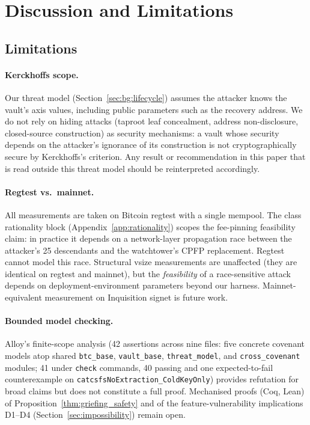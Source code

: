 
\section{Discussion and Limitations}
\label{sec:discussion}

\subsection{Limitations}
\label{sec:disc:limitations}

\paragraph{Kerckhoffs scope.}
Our threat model (Section~\ref{sec:bg:lifecycle}) assumes the
attacker knows the vault's axis values, including public parameters
such as the recovery address. We do not rely on hiding attacks
(taproot leaf concealment, address non-disclosure, closed-source
construction) as security mechanisms: a vault whose security depends
on the attacker's ignorance of its construction is not
cryptographically secure by Kerckhoffs's criterion. Any result or
recommendation in this paper that is read outside this threat model
should be reinterpreted accordingly.

\paragraph{Regtest vs.\ mainnet.}
All measurements are taken on Bitcoin regtest with a single mempool.
The class \classfee{} rationality block
(Appendix~\ref{app:rationality}) scopes the fee-pinning feasibility
claim: in practice it depends on a network-layer propagation race
between the attacker's 25 descendants and the watchtower's CPFP
replacement. Regtest cannot model this race. Structural vsize
measurements are unaffected (they are identical on regtest and
mainnet), but the \emph{feasibility} of a race-sensitive attack
depends on deployment-environment parameters beyond our harness.
Mainnet-equivalent measurement on Inquisition signet is future work.

\paragraph{Bounded model checking.}
Alloy's finite-scope analysis (42 assertions across nine files:
five concrete covenant models atop shared \texttt{btc\_base},
\texttt{vault\_base}, \texttt{threat\_model}, and
\texttt{cross\_covenant} modules; 41 under \texttt{check} commands,
40 passing and one expected-to-fail counterexample on
\texttt{catcsfsNoExtraction\_ColdKeyOnly}) provides refutation for
broad claims but does not constitute a full proof. Mechanised
proofs (Coq, Lean) of Proposition~\ref{thm:griefing_safety} and of
the feature-vulnerability implications D1--D4
(Section~\ref{sec:impossibility}) remain open.

